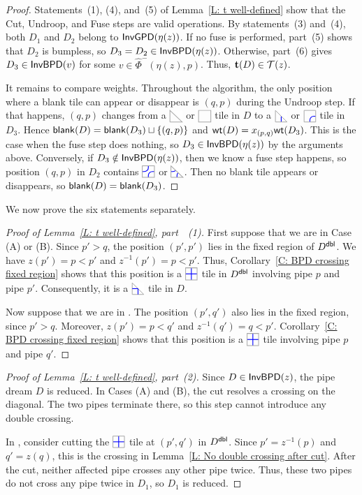\documentclass[10pt]{article}
\begin{document}
\begin{proof}
Statements~(1), (4), and~(5) of Lemma~\ref{L: t well-defined} show
that the Cut, Undroop, and Fuse steps are valid operations.
By statements~(3) and~(4), both $D_1$ and $D_2$ belong to
$\mathsf{InvGPD}(\eta(z))$.
If no fuse is performed, part~(5) shows that $D_2$ is bumpless,
so $D_3=D_2\in\mathsf{InvBPD}(\eta(z))$.
Otherwise, part~(6) gives $D_3\in\mathsf{InvBPD}(v)$ for some
$v\in\hat\Phi^{-}(\eta(z),p)$.
Thus, $\mathbf t(D)\in\mathcal{T}(z)$.

It remains to compare weights.
Throughout the algorithm, the only
position where a blank tile can appear
or disappear is $(q,p)$
during the Undroop step. 
If that happens, $(q,p)$ changes from a $\BDIAG$ or $\BTILE$ tile
in $D$ to a $\CDIAG$ or $\CTILE$ tile in $D_3$.
Hence $\mathsf{blank}(D)=\mathsf{blank}(D_3)\sqcup\{(q,p)\}$ and
$\mathsf{wt}(D)=x_{(p,q)}\mathsf{wt}(D_3)$.
This is the case when the fuse step does nothing, so  $D_3\in\mathsf{InvBPD}(\eta(z))$ 
by the arguments above. 
Conversely, if $D_3\notin\mathsf{InvBPD}(\eta(z))$,
then we know a fuse step happens,
so position $(q,p)$ in $D_2$ contains $\ETILE$ or
$\EDIAG$. 
Then no blank tile appears or disappears,
so $\mathsf{blank}(D) = \mathsf{blank}(D_3)$.
\end{proof}

We now prove the six statements separately.

\begin{proof}[Proof of Lemma~\ref{L: t well-defined}, part~~(1)]
First suppose that we are in Case (A) or (B).
Since $p'>q$, the position $(p',p')$ lies in the fixed region of
$D^{\mathsf{dbl}}$. We have $z(p')=p<p'$ and $z^{-1}(p')=p<p'$.
Thus, Corollary~\ref{C: BPD crossing fixed region} shows that this
position is a $\PTILE$ tile in $D^{\mathsf{dbl}}$ involving pipe $p$ and pipe $p'$.
Consequently, it is a $\PDIAG$ tile in $D$.

Now suppose that we are in \CaseC.
The position $(p',q')$ also lies in the fixed region, since $p'>q$.
Moreover, $z(p')=p<q'$ and $z^{-1}(q')=q<p'$.
Corollary~\ref{C: BPD crossing fixed region} shows that this position
is a $\PTILE$ tile involving pipe $p$ and pipe $q'$.
\end{proof}

\begin{proof}[Proof of Lemma~\ref{L: t well-defined}, part~(2)]
Since $D\in\mathsf{InvBPD}(z)$, the pipe dream $D$ is reduced.
In Cases (A) and (B), the cut resolves a crossing on the diagonal.
The two pipes terminate there, so this step cannot introduce any
double crossing.

In \CaseC, consider cutting the $\PTILE$ tile at $(p',q')$ in $D^{\mathsf{dbl}}$.
Since $p'=z^{-1}(p)$ and $q'=z(q)$, this is the crossing in
Lemma~\ref{L: No double crossing after cut}.
After the cut, neither affected pipe crosses any other pipe twice.
Thus, these two pipes do not cross any pipe twice in $D_1$,
so $D_1$ is reduced.
\end{proof}
\end{document}
